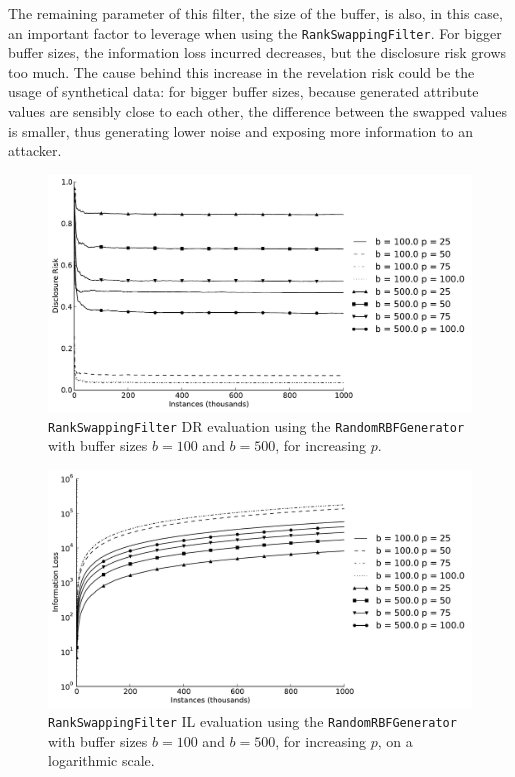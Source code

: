 The remaining parameter of this filter, the size of the buffer, is also, in this case, an important factor to leverage when using the \texttt{RankSwappingFilter}. For bigger buffer sizes, the information loss incurred decreases, but the disclosure risk grows too much. The cause behind this increase in the revelation risk could be the usage of synthetical data: for bigger buffer sizes, because generated attribute values are sensibly close to each other, the difference between the swapped values is smaller, thus generating lower noise and exposing more information to an attacker.

\begin{figure}[h]
	\centering
	\includegraphics[width=1.0\linewidth]{figures/dr_rs-random.pdf}
	\caption[Rank swapping DR evaluation ($b = \{100,500\}$).]{\texttt{RankSwappingFilter} DR evaluation using the \texttt{RandomRBFGenerator} with buffer sizes $b = 100$ and $b = 500$, for increasing $p$.}
	\label{fig:results-dr-rs}
\end{figure}

\begin{figure}[h]
	\centering
	\includegraphics[width=1.0\linewidth]{figures/il-log_rs-random.pdf}
	\caption[Rank swapping IL evaluation ($b = \{100,500\}$), logarithmic scale.]{\texttt{RankSwappingFilter} IL evaluation using the \texttt{RandomRBFGenerator} with buffer sizes $b = 100$ and $b = 500$, for increasing $p$, on a logarithmic scale.}
	\label{fig:results-il-log-rs}
\end{figure}

